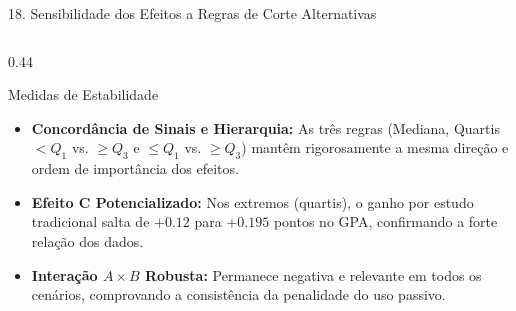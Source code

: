 \documentclass[aspectratio=169, 10pt]{beamer}
\begin{document}
\begin{frame}{18. Sensibilidade dos Efeitos a Regras de Corte Alternativas}
\begin{columns}[c]
        \begin{column}{0.44\textwidth}
            \begin{block}{Medidas de Estabilidade}
                \begin{itemize}\setlength{\itemsep}{5pt}\small
                    \item \textbf{Concordância de Sinais e Hierarquia:} As três regras (Mediana, Quartis $< Q_1$ vs. $\ge Q_3$ e $\le Q_1$ vs. $\ge Q_3$) mantêm rigorosamente a mesma direção e ordem de importância dos efeitos.
                    \item \textbf{Efeito C Potencializado:} Nos extremos (quartis), o ganho por estudo tradicional salta de $\mathbf{+0.12}$ para $\mathbf{+0.195}$ pontos no GPA, confirmando a forte relação dos dados.  
                    \item \textbf{Interação $A \times B$ Robusta:} Permanece negativa e relevante em todos os cenários, comprovando a consistência da penalidade do uso passivo.  

                    
                \end{itemize}
            \end{block}
        \end{column}
    \end{columns}
\end{frame}
\end{document}
